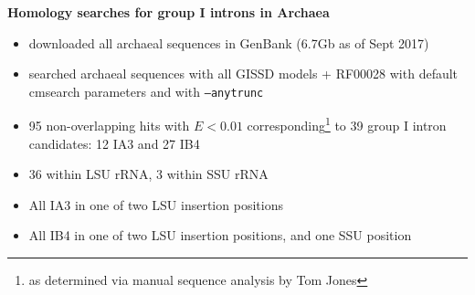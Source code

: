 \documentclass[landscape]{slides}
\begin{document}
\begin{slide}
\vfill
\end{slide}
\begin{slide}
\begin{center}
\textbf{Homology searches for group I introns in Archaea}
\end{center}
%
\small
\begin{itemize}
\item downloaded all archaeal sequences in GenBank (6.7Gb as of Sept
  2017)
\item searched archaeal sequences with all GISSD models + RF00028 with
  default cmsearch parameters and with \texttt{--anytrunc}
\item 95 non-overlapping hits with $E < 0.01$
  corresponding\footnote{as determined via manual sequence analysis by Tom Jones} to 39
  group I intron candidates: 12 IA3 and 27 IB4
\item 36 within LSU rRNA, 3 within SSU rRNA
\item All IA3 in one of two LSU insertion positions
\item All IB4 in one of two LSU insertion positions, and one SSU position
\end{itemize}  

\vfill
\end{slide}
\end{document}
